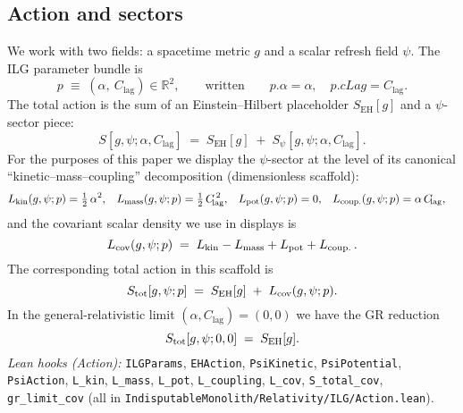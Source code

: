 \documentclass[12pt,a4paper]{article}
\begin{document}
\subsection{Action and sectors}
We work with two fields: a spacetime metric \(g\) and a scalar refresh field \(\psi\). The ILG parameter bundle is
\begin{equation}
  p \;\equiv\; (\alpha,\ C_{\!\mathrm{lag}})\in\mathbb{R}^2,
  \qquad\text{written}\qquad
  p.\alpha=\alpha,\quad p.c\!Lag=C_{\!\mathrm{lag}}.
\end{equation}
The total action is the sum of an Einstein–Hilbert placeholder \(S_{\mathrm{EH}}[g]\) and a \(\psi\)-sector piece:
\begin{equation}
  S[g,\psi; \alpha,C_{\!\mathrm{lag}}]
  \;=\;
  S_{\mathrm{EH}}[g] \;+\; S_\psi[g,\psi;\alpha,C_{\!\mathrm{lag}}].
  \label{eq:ILG-action-sum}
\end{equation}
For the purposes of this paper we display the \(\psi\)-sector at the level of its canonical ``kinetic–mass–coupling'' decomposition (dimensionless scaffold):
\begin{align}
  L_{\rm kin}(g,\psi;p) &= \tfrac12\,\alpha^2, &
  L_{\rm mass}(g,\psi;p) &= \tfrac12\,C_{\!\mathrm{lag}}^{\,2}, &
  L_{\rm pot}(g,\psi;p) &= 0, &
  L_{\rm coup.}(g,\psi;p) &= \alpha\,C_{\!\mathrm{lag}}, \label{eq:L-pieces}
\end{align}
and the covariant scalar density we use in displays is
\begin{equation}
  L_{\rm cov}(g,\psi;p)\;=\;L_{\rm kin}-L_{\rm mass}+L_{\rm pot}+L_{\rm coup.}\,.
  \label{eq:Lcov}
\end{equation}
The corresponding total action in this scaffold is
\begin{equation}
  S_{\rm tot}[g,\psi;p]\;=\;S_{\mathrm{EH}}[g]\;+\;L_{\rm cov}(g,\psi;p).
  \label{eq:S-total-cov}
\end{equation}
In the general-relativistic limit \((\alpha,C_{\!\mathrm{lag}})=(0,0)\) we have the GR reduction
\begin{equation}
  S_{\rm tot}[g,\psi;0,0]\;=\;S_{\mathrm{EH}}[g].
  \label{eq:cov-GR-limit}
\end{equation}
\emph{Lean hooks (Action):}
\texttt{ILGParams}, \texttt{EHAction}, \texttt{PsiKinetic}, \texttt{PsiPotential}, \texttt{PsiAction},
\texttt{L\_kin}, \texttt{L\_mass}, \texttt{L\_pot}, \texttt{L\_coupling}, \texttt{L\_cov},
\texttt{S\_total\_cov}, \texttt{gr\_limit\_cov} (all in \texttt{IndisputableMonolith/Relativity/ILG/Action.lean}).
\end{document}
